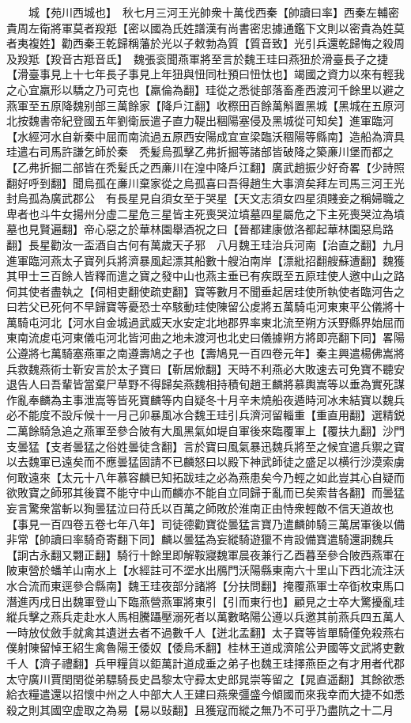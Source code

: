 　　城【苑川西城也】　秋七月三河王光帥衆十萬伐西秦【帥讀曰率】西秦左輔密貴周左衛將軍莫者羖羝【密以國為氏姓譜漢有尚書密忠據通鑑下文則以密貴為姓莫者夷複姓】勸西秦王乾歸稱藩於光以子敕勃為質【質音致】光引兵還乾歸悔之殺周及羖羝【羖音古羝音氐】　魏張衮聞燕軍將至言於魏王珪曰燕狃於滑臺長子之捷【滑臺事見上十七年長子事見上年狃與忸同杜預曰忸忲也】竭國之資力以來有輕我之心宜羸形以驕之乃可克也【羸倫為翻】珪從之悉徙部落畜產西渡河千餘里以避之燕軍至五原降魏别部三萬餘家【降戶江翻】收穄田百餘萬斛置黑城【黑城在五原河北按魏書帝紀登國五年劉衛辰遣子直力鞮出稒陽塞侵及黑城從可知矣】進軍臨河【水經河水自新秦中屈而南流過五原西安陽成宜宣梁臨沃稒陽等縣南】造船為濟具珪遣右司馬許謙乞師於秦　秃髪烏孤擊乙弗折掘等諸部皆破降之築亷川堡而都之【乙弗折掘二部皆在禿髪氏之西亷川在湟中降戶江翻】廣武趙振少好奇畧【少詩照翻好呼到翻】聞烏孤在亷川棄家從之烏孤喜曰吾得趙生大事濟矣拜左司馬三河王光封烏孤為廣武郡公　有長星見自須女至于哭星【天文志須女四星須賤妾之稱婦職之卑者也斗牛女揚州分虛二星危三星皆主死喪哭泣墳墓四星屬危之下主死喪哭泣為墳墓也見賢遍翻】帝心惡之於華林園舉酒祝之曰【晉都建康倣洛都起華林園惡烏路翻】長星勸汝一盃酒自古何有萬歲天子邪　八月魏王珪治兵河南【治直之翻】九月進軍臨河燕太子寶列兵將濟暴風起漂其船數十艘泊南岸【漂紕招翻艘蘇遭翻】魏獲其甲士三百餘人皆釋而遣之寶之發中山也燕主垂已有疾既至五原珪使人邀中山之路伺其使者盡執之【伺相吏翻使疏吏翻】寶等數月不聞垂起居珪使所執使者臨河告之曰若父已死何不早歸寶等憂恐士卒駭動珪使陳留公䖍將五萬騎屯河東東平公儀將十萬騎屯河北【河水自金城過武威天水安定北地郡界率東北流至朔方沃野縣界始屈而東南流䖍屯河東儀屯河北皆河曲之地未渡河也北史曰儀據朔方將即亮翻下同】畧陽公遵將七萬騎塞燕軍之南遵壽鳩之子也【壽鳩見一百四卷元年】秦主興遣楊佛嵩將兵救魏燕術士靳安言於太子寶曰【靳居焮翻】天時不利燕必大敗速去可免寶不聽安退告人曰吾輩皆當棄尸草野不得歸矣燕魏相持積旬趙王麟將慕輿嵩等以垂為實死謀作亂奉麟為主事泄嵩等皆死寶麟等内自疑冬十月辛未燒船夜遁時河冰未結寶以魏兵必不能度不設斥候十一月己卯暴風冰合魏王珪引兵濟河留輜重【重直用翻】選精鋭二萬餘騎急追之燕軍至參合陂有大風黑氣如堤自軍後來臨覆軍上【覆扶九翻】沙門支曇猛【支者曇猛之俗姓曇徒含翻】言於寶曰風氣暴迅魏兵將至之候宜遣兵禦之寶以去魏軍已遠矣而不應曇猛固請不已麟怒曰以殿下神武師徒之盛足以横行沙漠索虜何敢遠來【太元十八年慕容麟已知拓跋珪之必為燕患矣今乃輕之如此豈其心自疑而欲敗寶之師邪其後寶不能守中山而麟亦不能自立同歸于亂而已矣索昔各翻】而曇猛妄言驚衆當斬以狥曇猛泣曰苻氏以百萬之師敗於淮南正由恃衆輕敵不信天道故也【事見一百四卷五卷七年八年】司徒德勸寶從曇猛言寶乃遣麟帥騎三萬居軍後以備非常【帥讀曰率騎奇寄翻下同】麟以曇猛為妄縱騎遊獵不肯設備寶遣騎還詗魏兵【詗古永翻又翾正翻】騎行十餘里即解鞍寢魏軍晨夜兼行乙酉暮至參合陂西燕軍在陂東營於蟠羊山南水上【水經註可不埿水出鴈門沃陽縣東南六十里山下西北流注沃水合流而東逕參合縣南】魏王珪夜部分諸將【分扶問翻】掩覆燕軍士卒衘枚束馬口潛進丙戌日出魏軍登山下臨燕營燕軍將東引【引而東行也】顧見之士卒大驚擾亂珪縱兵擊之燕兵走赴水人馬相騰躡壓溺死者以萬數略陽公遵以兵邀其前燕兵四五萬人一時放仗斂手就禽其遺迸去者不過數千人【迸北孟翻】太子寶等皆單騎僅免殺燕右僕射陳留悼王紹生禽魯陽王倭奴【倭烏禾翻】桂林王道成濟隂公尹國等文武將吏數千人【濟子禮翻】兵甲糧貨以鉅萬計道成垂之弟子也魏王珪擇燕臣之有才用者代郡太守廣川賈閏閏從弟驃騎長史昌黎太守彛太史郎晁崇等留之【晁直遥翻】其餘欲悉給衣糧遣還以招懷中州之人中部大人王建曰燕衆彊盛今傾國而來我幸而大捷不如悉殺之則其國空虚取之為易【易以䜴翻】且獲寇而縱之無乃不可乎乃盡阬之十二月
